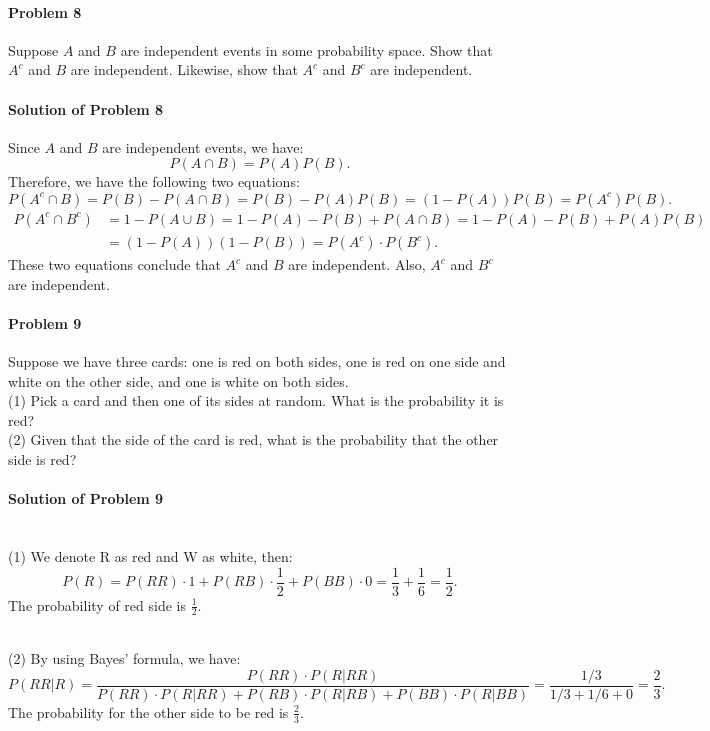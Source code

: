 \documentclass{article}
\begin{document}
\paragraph{Problem 8} Suppose $A$ and $B$ are independent events in some probability space. Show that $A^c$ and $B$ are independent. Likewise, show that $A^c$ and $B^c$ are independent. 

\paragraph{Solution of Problem 8} Since $A$ and $B$ are independent events, we have:
\[P(A\cap B)=P(A)P(B).\]
Therefore, we have the following two equations:
\[P(A^c\cap B)=P(B)-P(A\cap B)=P(B)-P(A)P(B)=(1-P(A))P(B)=P(A^c)P(B).\]
\begin{equation*}
\begin{aligned}
P(A^c\cap B^c) &= 1-P(A\cup B)=1-P(A)-P(B)+P(A\cap B)=1-P(A)-P(B)+P(A)P(B)\\
&=(1-P(A))(1-P(B))=P(A^c)\cdot P(B^c).
\end{aligned}    
\end{equation*}
These two equations conclude that $A^c$ and $B$ are independent. Also, $A^c$ and $B^c$ are independent. 


\paragraph{Problem 9} Suppose we have three cards: one is red on both sides, one is red on one side and white on the other side, and one is white on both sides. \\
(1) Pick a card and then one of its sides at random. What is the probability it is red?\\
(2) Given that the side of the card is red, what is the probability that the other side is red?

\paragraph{Solution of Problem 9}~\\
(1) We denote R as red and W as white, then:
\[P(R)=P(RR)\cdot 1+P(RB)\cdot \frac12 + P(BB)\cdot 0 = \frac13+\frac16=\frac12.\]
The probability of red side is $\frac12$. 

~\\
(2) By using Bayes' formula, we have:
\[P(RR|R)=\frac{P(RR)\cdot P(R|RR)}{P(RR)\cdot P(R|RR)+P(RB)\cdot P(R|RB)+P(BB)\cdot P(R|BB)}=\frac{1/3}{1/3+1/6+0}=\frac23.\]
The probability for the other side to be red is $\frac23$.
\end{document}
